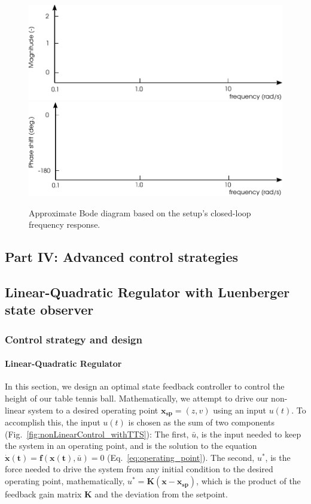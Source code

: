 \documentclass[10pt,twoside,openright]{article}
\begin{document}
		\begin{figure}[h!]
			\centering
			\includegraphics[width=0.75\linewidth]{bode_diagram_empty_1.pdf}
			\includegraphics[width=0.75\linewidth]{bode_diagram_empty_2.pdf}
			\caption{Approximate Bode diagram based on the setup's closed-loop frequency response.}
 		\end{figure}

\subsection*{Part IV: Advanced control strategies}

\subsection{Linear-Quadratic Regulator with Luenberger state observer}

\subsubsection{Control strategy and design}
\paragraph{Linear-Quadratic Regulator} In this section, we design an optimal state feedback controller to control the height of our table tennis ball. Mathematically, we attempt to drive our non-linear system to a desired operating point $\bm{x_{\text{sp}}} = (z, v)$ using an input $u(t)$. To accomplish this, the input $u(t)$ is chosen as the sum of two components (Fig.~\ref{fig:nonLinearControl_withTTS}): The first, $\bar{u}$, is the input needed to keep the system in an operating point, and is the solution to the equation $\bm{\dot{x}(t)} = \bm{f}(\bm{x(t)}, \bar{u}) = 0$ (Eq.~\ref{eq:operating_point}). The second, $u^*$, is the force needed to drive the system from any initial condition to the desired operating point, mathematically, $u^* = \bm{K} (\bm{x} - \bm{x_{\text{sp}}})$, which is the product of the feedback gain matrix $\bm{K}$ and the deviation from the setpoint.\\
\end{document}
